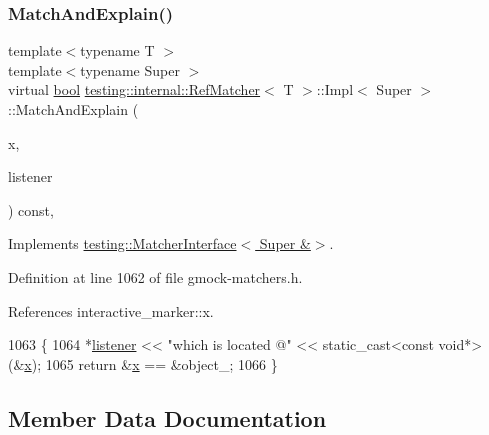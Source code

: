 \subsubsection{\texorpdfstring{Match\+And\+Explain()}{MatchAndExplain()}}
{\footnotesize\ttfamily template$<$typename T $>$ \\
template$<$typename Super $>$ \\
virtual \hyperlink{classbool}{bool} \hyperlink{classtesting_1_1internal_1_1RefMatcher}{testing\+::internal\+::\+Ref\+Matcher}$<$ T $>$\+::Impl$<$ Super $>$\+::Match\+And\+Explain (\begin{DoxyParamCaption}\item[{Super \&}]{x,  }\item[{\hyperlink{classtesting_1_1MatchResultListener}{Match\+Result\+Listener} $\ast$}]{listener }\end{DoxyParamCaption}) const\hspace{0.3cm}{\ttfamily [inline]}, {\ttfamily [virtual]}}



Implements \hyperlink{classtesting_1_1MatcherInterface_a296b43607cd99d60365f0e6a762777cf}{testing\+::\+Matcher\+Interface$<$ Super \&$>$}.



Definition at line 1062 of file gmock-\/matchers.\+h.



References interactive\+\_\+marker\+::x.


\begin{DoxyCode}
1063                                                        \{
1064       *\hyperlink{namespaceinteractive__marker_a0e579ab555212bb5e2c9f8a675b7618a}{listener} << \textcolor{stringliteral}{"which is located @"} << \textcolor{keyword}{static\_cast<}\textcolor{keyword}{const }\textcolor{keywordtype}{void}*\textcolor{keyword}{>}(&\hyperlink{namespaceinteractive__marker_acda52804aef30b460a72fb21ee01d69d}{x});
1065       \textcolor{keywordflow}{return} &\hyperlink{namespaceinteractive__marker_acda52804aef30b460a72fb21ee01d69d}{x} == &object\_;
1066     \}
\end{DoxyCode}


\subsection{Member Data Documentation}
\mbox{\label{classtesting_1_1internal_1_1RefMatcher_3_01T_01_6_01_4_1_1Impl_a534fb65e97f9b601460eb8b0ad09074e}} 
